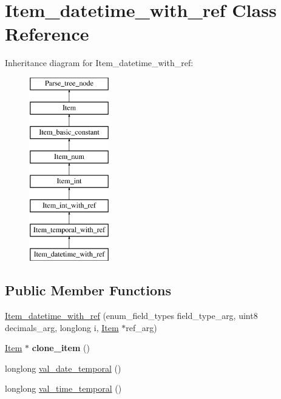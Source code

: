 \hypertarget{classItem__datetime__with__ref}{}\section{Item\+\_\+datetime\+\_\+with\+\_\+ref Class Reference}
\label{classItem__datetime__with__ref}
Inheritance diagram for Item\+\_\+datetime\+\_\+with\+\_\+ref\+:\begin{figure}[H]
\begin{center}
\leavevmode
\includegraphics[height=8.000000cm]{classItem__datetime__with__ref}
\end{center}
\end{figure}
\subsection*{Public Member Functions}
\begin{DoxyCompactItemize}
\item 
\mbox{\hyperlink{classItem__datetime__with__ref_ab42f4b507fe38cd2b4ab2673f4842428}{Item\+\_\+datetime\+\_\+with\+\_\+ref}} (enum\+\_\+field\+\_\+types field\+\_\+type\+\_\+arg, uint8 decimals\+\_\+arg, longlong i, \mbox{\hyperlink{classItem}{Item}} $\ast$ref\+\_\+arg)
\item 
\mbox{\label{classItem__datetime__with__ref_a0c2e1f3c8e8c443eb062e0a3c68344ca}} 
\mbox{\hyperlink{classItem}{Item}} $\ast$ {\bfseries clone\+\_\+item} ()
\item 
longlong \mbox{\hyperlink{classItem__datetime__with__ref_acc643536450eae3ce88e244d70b8e3e5}{val\+\_\+date\+\_\+temporal}} ()
\item 
longlong \mbox{\hyperlink{classItem__datetime__with__ref_ad4f0af48197792dcbd0ce0bbac488cbd}{val\+\_\+time\+\_\+temporal}} ()
\end{DoxyCompactItemize}
